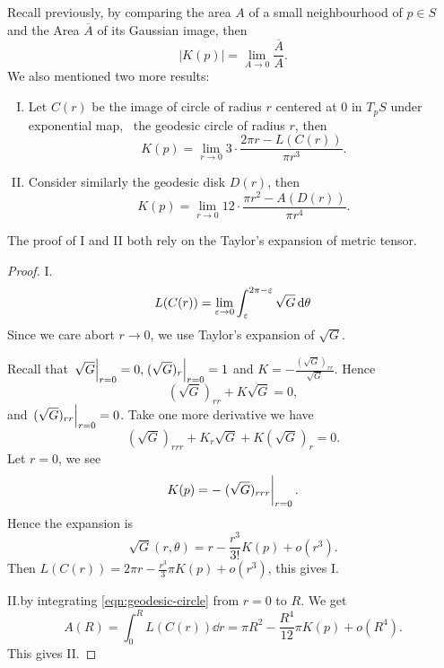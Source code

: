 Recall previously, by comparing the area \(A\) of a small neighbourhood of \(p\in S\)
and the Area \(\overline{A}\) of its Gaussian image, then \[
    |K(p)|=\lim_{A \to 0} \frac{\overline{A}}{A}
.\] We also mentioned two more results:
\begin{enumerate}[I.]
\item Let \(C(r)\) be the image of circle of radius \(r\) centered at 0 in \(T_p S\)
    under exponential map, \ie\ the geodesic circle of radius \(r\), then \[
        K(p)=\lim_{r \to 0} 3\cdot\frac{2\pi r-L(C(r))}{\pi r^3}
    .\]
\item Consider similarly the geodesic disk \(D(r)\), then \[
    K(p)=\lim_{r \to 0} 12\cdot \frac{\pi r^2-A(D(r))}{\pi r^4}
.\]
\end{enumerate}
The proof of I and II both rely on the Taylor's expansion of metric tensor.
\begin{proof}
I. \[
    L(C(r))=\lim_{\varepsilon \to 0} \int_{\varepsilon}^{2\pi-\varepsilon}\sqrt{G}\dd{\theta}
\] Since we care abort \(r\to 0\), we use Taylor's expansion of \(\sqrt{G}\).

Recall that \(\eval{\sqrt{G}}_{r=0}=0,\eval{(\sqrt{G})_r}_{r=0}=1\) and \(K=
-\frac{(\sqrt{G})_{rr}}{\sqrt{G}}\). Hence \[
    (\sqrt{G})_{rr}+K\sqrt{G}=0
,\] and \(\eval{(\sqrt{G})_{rr}}_{r=0}=0\). Take one more derivative we have \[
    (\sqrt{G})_{rrr}+K_r\sqrt{G}+K(\sqrt{G})_{r}=0
.\] Let \(r=0\), we see \[
    K(p)=-\eval{(\sqrt{G})_{rrr}}_{r=0}
.\] Hence the expansion is 
\begin{equation}\label{eqn:geodesic-circle}
    \sqrt{G}(r,\theta)=r-\frac{r^3}{3!}K(p)+o(r^3)
.\end{equation}
Then \(L(C(r))=2\pi r-\frac{r^3}{3}\pi K(p)+o(r^3)\), this gives I.

II.\@Follows by integrating \cref{eqn:geodesic-circle} from \(r=0\) to \(R\). We get \[
    A(R)=\int_{0}^{R}L(C(r))\dd{r}=\pi R^2-\frac{R^4}{12}\pi K(p)+o(R^4)
.\] This gives II.
\end{proof}

